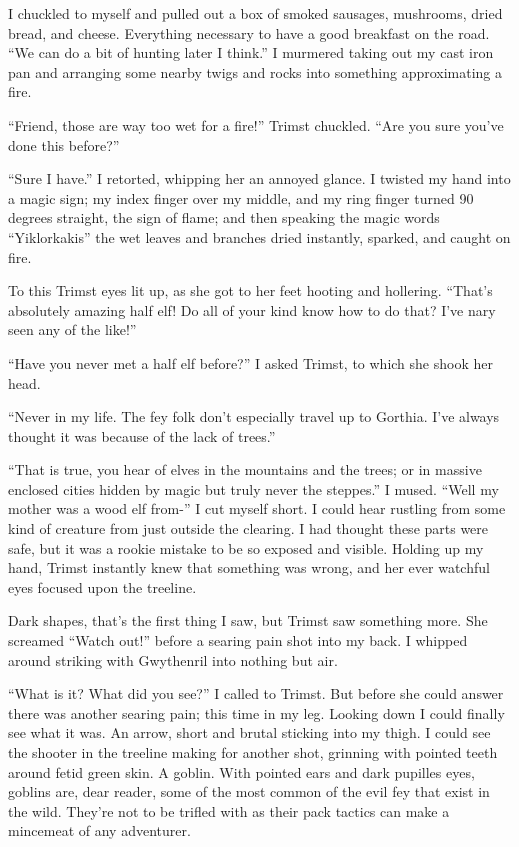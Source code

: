\documentclass[12pt, a4paper]{book}
\begin{document}
I chuckled to myself and pulled out a box of smoked sausages, mushrooms, dried bread, and cheese. Everything necessary to have a good breakfast on the road. ``We can do a bit of hunting later I think.'' I murmered taking out my cast iron pan and arranging some nearby twigs and rocks into something approximating a fire.

``Friend, those are way too wet for a fire!'' Trimst chuckled. ``Are you sure you've done this before?''

``Sure I have.'' I retorted, whipping her an annoyed glance. I twisted my hand into a magic sign; my index finger over my middle, and my ring finger turned 90 degrees straight, the sign of flame; and then speaking the magic words ``Yiklorkakis'' the wet leaves and branches dried instantly, sparked, and caught on fire.

To this Trimst eyes lit up, as she got to her feet hooting and hollering. ``That's absolutely amazing half elf! Do all of your kind know how to do that? I've nary seen any of the like!''

``Have you never met a half elf before?'' I asked Trimst, to which she shook her head.

``Never in my life. The fey folk don't especially travel up to Gorthia. I've always thought it was because of the lack of trees.''

``That is true, you hear of elves in the mountains and the trees; or in massive enclosed cities hidden by magic but truly never the steppes.'' I mused. ``Well my mother was a wood elf from-'' I cut myself short. I could hear rustling from some kind of creature from just outside the clearing. I had thought these parts were safe, but it was a rookie mistake to be so exposed and visible. Holding up my hand, Trimst instantly knew that something was wrong, and her ever watchful eyes focused upon the treeline.

Dark shapes, that's the first thing I saw, but Trimst saw something more. She screamed ``Watch out!'' before a searing pain shot into my back. I whipped around striking with Gwythenril into nothing but air.

``What is it? What did you see?'' I called to Trimst. But before she could answer there was another searing pain; this time in my leg. Looking down I could finally see what it was. An arrow, short and brutal sticking into my thigh. I could see the shooter in the treeline making for another shot, grinning with pointed teeth around fetid green skin. A goblin. With pointed ears and dark pupilles eyes, goblins are, dear reader, some of the most common of the evil fey that exist in the wild. They're not to be trifled with as their pack tactics can make a mincemeat of any adventurer. 
\end{document}
